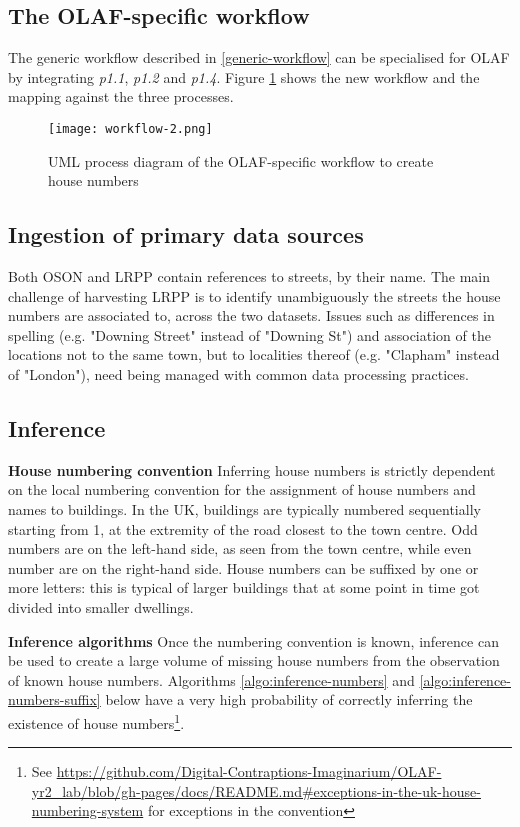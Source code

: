 \subsection{The OLAF-specific workflow}

The generic workflow described in \ref{generic-workflow} can be specialised for OLAF by integrating {\it p1.1}, {\it p1.2} and {\it p1.4}. Figure \ref{fig:workflow_2} shows the new workflow and the mapping against the three processes. 

\begin{figure}
	\texttt{[image: workflow-2.png]}
	\caption{UML process diagram of the OLAF-specific workflow to create house numbers}
	\label{fig:workflow_2}
\end{figure}

\subsection{Ingestion of primary data sources} 

Both OSON and LRPP contain references to streets, by their name. The main challenge of harvesting LRPP is to identify unambiguously the streets the house numbers are associated to, across the two datasets. Issues such as differences in spelling (e.g. "Downing Street" instead of "Downing St") and association of the locations not to the same town, but to localities thereof (e.g. "Clapham" instead of "London"), need being managed with common data processing practices.

\subsection{Inference} 
\label{inference-algorithms} 

\textbf{House numbering convention} Inferring house numbers is strictly dependent on the local numbering convention for the assignment of house numbers and names to buildings. In the UK, buildings are typically numbered sequentially starting from 1, at the extremity of the road closest to the town centre. Odd numbers are on the left-hand side, as seen from the town centre, while even number are on the right-hand side. House numbers can be suffixed by one or more letters: this is typical of larger buildings that at some point in time got divided into smaller dwellings. 
        
\textbf{Inference algorithms} Once the numbering convention is known, inference can be used to create a large volume of missing house numbers from the observation of known house numbers. Algorithms \ref{algo:inference-numbers} and \ref{algo:inference-numbers-suffix} below have a very high probability of correctly inferring the existence of house numbers\footnote{See \url{https://github.com/Digital-Contraptions-Imaginarium/OLAF-yr2_lab/blob/gh-pages/docs/README.md#exceptions-in-the-uk-house-numbering-system} for exceptions in the convention}. 

